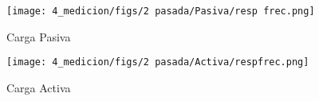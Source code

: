 \begin{figure}[ht]
    \centering
    \texttt{[image: 4\_medicion/figs/2 pasada/Pasiva/resp frec.png]}
    \caption{Carga Pasiva}
    \label{fig:frec carga pasiva}
\end{figure}

\begin{figure}[ht]
    \centering
    \texttt{[image: 4\_medicion/figs/2 pasada/Activa/respfrec.png]}
    \caption{Carga Activa}
    \label{fig:frec carga activa}
\end{figure}